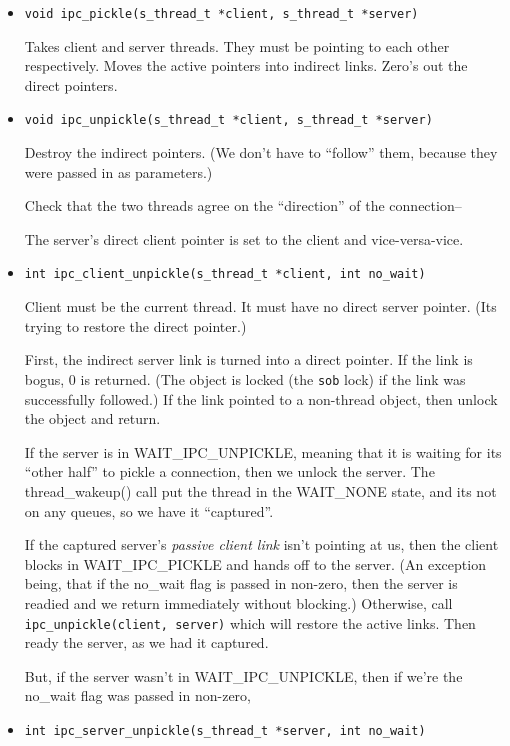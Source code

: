 \begin{itemize}

\item {\tt void ipc_pickle(s_thread_t *client, s_thread_t *server)}

Takes client and server threads.  They must be pointing to each other
respectively.  Moves the active pointers into indirect links.  Zero's
out the direct pointers.
 
\item {\tt void ipc_unpickle(s_thread_t *client, s_thread_t *server)}

Destroy the indirect pointers.  (We don't have to ``follow'' them,
because they were passed in as parameters.)

Check that the two threads agree on the ``direction'' of the
connection--



The server's direct client pointer is set to the client and
vice-versa-vice.

\item {\tt int ipc_client_unpickle(s_thread_t *client, int no_wait)}

Client must be the current thread.  It must have no direct server
pointer.  (Its trying to restore the direct pointer.)

First, the indirect server link is turned into a direct pointer. If
the link is bogus, 0 is returned.  (The object is locked (the {\tt sob}
lock) if the link was successfully followed.)  If the link pointed to a
non-thread object, then unlock the object and return.


If the server is in WAIT_IPC_UNPICKLE, meaning that it is waiting
for its ``other half'' to pickle a connection,  then we unlock the
server.  The thread_wakeup() call put the thread in the WAIT_NONE
state, and its not on any queues, so we have it ``captured''.

If the captured server's {\em passive client link} isn't pointing at
us, then the client blocks in WAIT_IPC_PICKLE and hands off to the
server.  (An exception being, that if the no_wait flag is passed in
non-zero, then the server is readied and we return immediately without
blocking.) Otherwise, call {\tt ipc_unpickle(client, server)} which
will restore the active links.  Then ready the server, as we had it
captured.

But, if the server wasn't in WAIT_IPC_UNPICKLE, then if we're the
no_wait flag was passed in non-zero, 

\item {\tt int ipc_server_unpickle(s_thread_t *server, int no_wait)}

\end{itemize}

